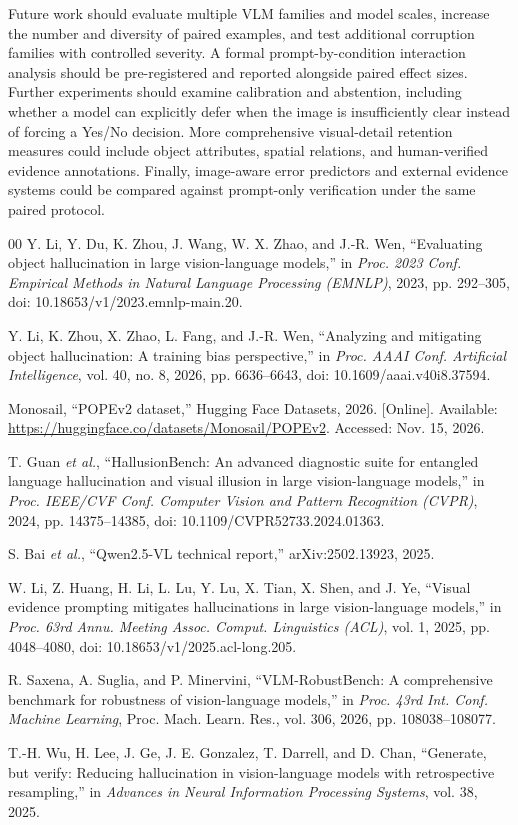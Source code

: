 \documentclass[conference]{IEEEtran}
\begin{document}
Future work should evaluate multiple VLM families and model scales, increase the number and diversity of paired examples, and test additional corruption families with controlled severity. A formal prompt-by-condition interaction analysis should be pre-registered and reported alongside paired effect sizes. Further experiments should examine calibration and abstention, including whether a model can explicitly defer when the image is insufficiently clear instead of forcing a Yes/No decision. More comprehensive visual-detail retention measures could include object attributes, spatial relations, and human-verified evidence annotations. Finally, image-aware error predictors and external evidence systems could be compared against prompt-only verification under the same paired protocol.

\balance
\begin{thebibliography}{00}
Y. Li, Y. Du, K. Zhou, J. Wang, W. X. Zhao, and J.-R. Wen, ``Evaluating object hallucination in large vision-language models,'' in \emph{Proc. 2023 Conf. Empirical Methods in Natural Language Processing (EMNLP)}, 2023, pp. 292--305, doi: 10.18653/v1/2023.emnlp-main.20.

Y. Li, K. Zhou, X. Zhao, L. Fang, and J.-R. Wen, ``Analyzing and mitigating object hallucination: A training bias perspective,'' in \emph{Proc. AAAI Conf. Artificial Intelligence}, vol. 40, no. 8, 2026, pp. 6636--6643, doi: 10.1609/aaai.v40i8.37594.

Monosail, ``POPEv2 dataset,'' Hugging Face Datasets, 2026. [Online]. Available: \url{https://huggingface.co/datasets/Monosail/POPEv2}. Accessed: Nov. 15, 2026.

T. Guan \emph{et al.}, ``HallusionBench: An advanced diagnostic suite for entangled language hallucination and visual illusion in large vision-language models,'' in \emph{Proc. IEEE/CVF Conf. Computer Vision and Pattern Recognition (CVPR)}, 2024, pp. 14375--14385, doi: 10.1109/CVPR52733.2024.01363.

S. Bai \emph{et al.}, ``Qwen2.5-VL technical report,'' arXiv:2502.13923, 2025.

W. Li, Z. Huang, H. Li, L. Lu, Y. Lu, X. Tian, X. Shen, and J. Ye, ``Visual evidence prompting mitigates hallucinations in large vision-language models,'' in \emph{Proc. 63rd Annu. Meeting Assoc. Comput. Linguistics (ACL)}, vol. 1, 2025, pp. 4048--4080, doi: 10.18653/v1/2025.acl-long.205.

R. Saxena, A. Suglia, and P. Minervini, ``VLM-RobustBench: A comprehensive benchmark for robustness of vision-language models,'' in \emph{Proc. 43rd Int. Conf. Machine Learning}, Proc. Mach. Learn. Res., vol. 306, 2026, pp. 108038--108077.

T.-H. Wu, H. Lee, J. Ge, J. E. Gonzalez, T. Darrell, and D. Chan, ``Generate, but verify: Reducing hallucination in vision-language models with retrospective resampling,'' in \emph{Advances in Neural Information Processing Systems}, vol. 38, 2025.
\end{thebibliography}
\end{document}

